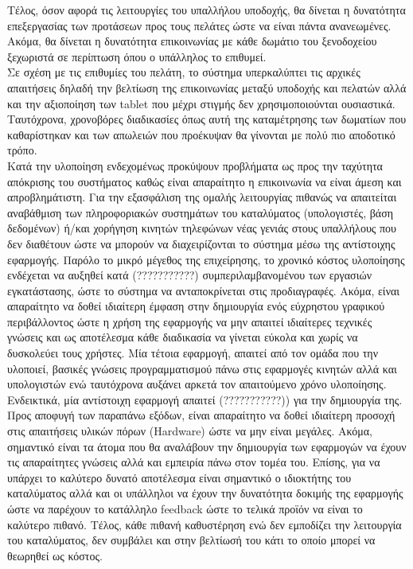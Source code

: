 \noindent
Τέλος, όσον αφορά τις λειτουργίες του υπαλλήλου υποδοχής, θα δίνεται η δυνατότητα επεξεργασίας των
προτάσεων προς τους πελάτες ώστε να είναι πάντα ανανεωμένες. Ακόμα, θα δίνεται η δυνατότητα επικοινωνίας
με κάθε δωμάτιο του ξενοδοχείου ξεχωριστά σε περίπτωση όπου ο υπάλληλος το επιθυμεί.\\

\noindent
Σε σχέση με τις επιθυμίες του πελάτη, το σύστημα υπερκαλύπτει τις αρχικές απαιτήσεις δηλαδή την 
βελτίωση της επικοινωνίας μεταξύ υποδοχής και πελατών αλλά και την αξιοποίηση των tablet που μέχρι 
στιγμής δεν χρησιμοποιούνται ουσιαστικά. Ταυτόχρονα, χρονοβόρες διαδικασίες όπως αυτή της 
καταμέτρησης των δωματίων που καθαρίστηκαν και των απωλειών που προέκυψαν θα γίνονται με πολύ πιο 
αποδοτικό τρόπο. \\

\noindent
Κατά την υλοποίηση ενδεχομένως προκύψουν προβλήματα ως προς την ταχύτητα απόκρισης του συστήματος 
καθώς είναι απαραίτητο η επικοινωνία να είναι άμεση και απροβλημάτιστη. Για την εξασφάλιση της ομαλής 
λειτουργίας πιθανώς να απαιτείται αναβάθμιση των πληροφοριακών συστημάτων του καταλύματος 
(υπολογιστές, βάση δεδομένων) ή/και χορήγηση κινητών τηλεφώνων νέας γενιάς στους υπαλλήλους που δεν 
διαθέτουν ώστε  να μπορούν να διαχειρίζονται το σύστημα μέσω της αντίστοιχης εφαρμογής. Παρόλο το 
μικρό μέγεθος της επιχείρησης, το χρονικό κόστος υλοποίησης ενδέχεται να αυξηθεί κατά (???????????) 
συμπεριλαμβανομένου των εργασιών εγκατάστασης, ώστε το σύστημα να ανταποκρίνεται στις προδιαγραφές.
Ακόμα, είναι απαραίτητο να δοθεί ιδιαίτερη έμφαση στην δημιουργία ενός εύχρηστου γραφικού 
περιβάλλοντος ώστε η χρήση της εφαρμογής να μην απαιτεί ιδιαίτερες τεχνικές γνώσεις και ως αποτέλεσμα 
κάθε διαδικασία να γίνεται εύκολα και χωρίς να δυσκολεύει τους χρήστες. Μία τέτοια εφαρμογή, απαιτεί 
από τον ομάδα που την υλοποιεί, βασικές γνώσεις προγραμματισμού πάνω στις εφαρμογές κινητών αλλά και 
υπολογιστών ενώ ταυτόχρονα αυξάνει αρκετά τον απαιτούμενο χρόνο υλοποίησης. Ενδεικτικά, μία 
αντίστοιχη εφαρμογή  απαιτεί (???????????)) για την δημιουργία της.\\ 

\noindent
Προς αποφυγή των παραπάνω εξόδων, είναι απαραίτητο να δοθεί ιδιαίτερη προσοχή στις απαιτήσεις υλικών 
πόρων (Hardware) ώστε να μην είναι μεγάλες. Ακόμα, σημαντικό είναι τα άτομα που θα αναλάβουν την 
δημιουργία των εφαρμογών να έχουν τις απαραίτητες γνώσεις αλλά και εμπειρία πάνω στον τομέα του. 
Επίσης, για να υπάρχει το καλύτερο δυνατό αποτέλεσμα είναι σημαντικό ο ιδιοκτήτης του καταλύματος 
αλλά και οι υπάλληλοι να έχουν την δυνατότητα δοκιμής της εφαρμογής ώστε να παρέχουν το κατάλληλο 
feedback ώστε το τελικά προϊόν να είναι το καλύτερο πιθανό. Τέλος, κάθε πιθανή καθυστέρηση ενώ δεν 
εμποδίζει την λειτουργία του καταλύματος, δεν συμβάλει και στην βελτίωσή του κάτι το οποίο μπορεί να 
θεωρηθεί ως κόστος.
		
		
		    